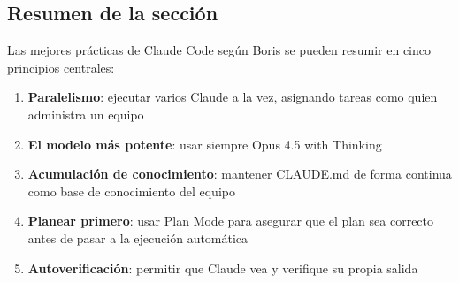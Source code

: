 \subsection{Resumen de la sección}

Las mejores prácticas de Claude Code según Boris se pueden resumir en cinco principios centrales:
\begin{enumerate}
    \item \textbf{Paralelismo}: ejecutar varios Claude a la vez, asignando tareas como quien administra un equipo
    \item \textbf{El modelo más potente}: usar siempre Opus 4.5 with Thinking
    \item \textbf{Acumulación de conocimiento}: mantener CLAUDE.md de forma continua como base de conocimiento del equipo
    \item \textbf{Planear primero}: usar Plan Mode para asegurar que el plan sea correcto antes de pasar a la ejecución automática
    \item \textbf{Autoverificación}: permitir que Claude vea y verifique su propia salida
\end{enumerate}
